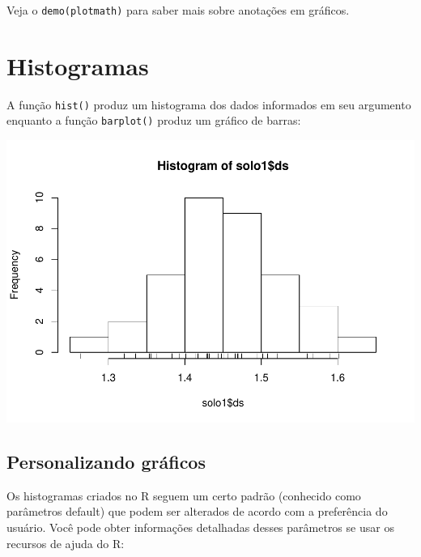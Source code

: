 \documentclass[
]{book}
\newenvironment{Shaded}{\begin{snugshade}}{\end{snugshade}}
\newcommand{\KeywordTok}[1]{\textcolor[rgb]{0.13,0.29,0.53}{\textbf{#1}}}
\newcommand{\NormalTok}[1]{#1}
\newcommand{\OperatorTok}[1]{\textcolor[rgb]{0.81,0.36,0.00}{\textbf{#1}}}
\begin{document}
Veja o \texttt{demo(plotmath)} para saber mais sobre anotações em gráficos.

\hypertarget{histogramas}{%
\section{Histogramas}\label{histogramas}}

A função \texttt{hist()} produz um histograma dos dados informados em seu argumento enquanto a função \texttt{barplot()} produz um gráfico de barras:

\begin{Shaded}
\end{Shaded}

\includegraphics{TudodoR_files/figure-latex/unnamed-chunk-167-1.pdf}

\hypertarget{personalizando-gruxe1ficos}{%
\subsection{Personalizando gráficos}\label{personalizando-gruxe1ficos}}

Os histogramas criados no R seguem um certo padrão (conhecido como parâmetros
default) que podem ser alterados de acordo com a preferência do usuário. Você pode obter informações detalhadas desses parâmetros se usar os recursos de ajuda do R:
\end{document}
